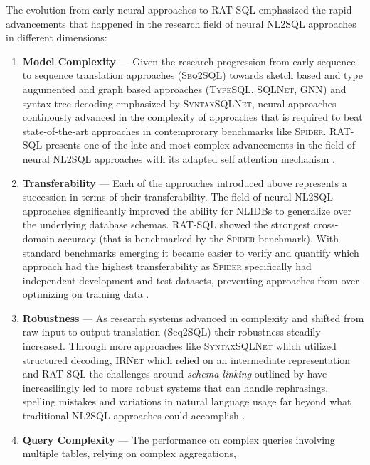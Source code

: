 \documentclass{article}
\begin{document}
The evolution from early neural approaches to RAT-SQL emphasized the rapid advancements that happened in the research field of 
neural NL2SQL approaches in different dimensions:

\begin{enumerate}
    \item \textbf{Model Complexity} — Given the research progression from early sequence to sequence translation approaches 
          (\textsc{Seq2SQL}) towards sketch based and type augumented and graph based approaches (\textsc{TypeSQL, SQLNet, GNN})
          and syntax tree decoding emphasized by \textsc{SyntaxSQLNet}, neural approaches continously advanced in the complexity of 
          approaches that is required to beat state-of-the-art approaches in contemprorary benchmarks like \textsc{Spider}. RAT-SQL 
          presents one of the late and most complex advancements in the field of neural NL2SQL approaches with its adapted self 
          attention mechanism \citep{Seq2SQL, TypeSQL, GNN, SyntaxSQLNet, RATSQL}.
    \item \textbf{Transferability} — Each of the approaches introduced above represents a succession in terms of their transferability.
          The field of neural NL2SQL approaches significantly improved the ability for NLIDBs to generalize over the underlying database
          schemas. RAT-SQL showed the strongest cross-domain accuracy (that is benchmarked by the \textsc{Spider} benchmark). With
          standard benchmarks emerging it became easier to verify and quantify which approach had the highest transferability as
          \textsc{Spider} specifically had independent development and test datasets, preventing approaches from over-optimizing on
          training data \citep{Spider, RATSQL}.
    \item \textbf{Robustness} — As research systems advanced in complexity and shifted from raw input to output translation (Seq2SQL)
          their robustness steadily increased. Through more approaches like \textsc{SyntaxSQLNet} which utilized structured decoding,
          \textsc{IRNet} which relied on an intermediate representation and \textsc{RAT-SQL} the challenges around \textit{schema linking}
          outlined by \cite{RATSQL} have increasilingly led to more robust systems that can handle rephrasings, spelling mistakes and
          variations in natural language usage far beyond what traditional NL2SQL approaches could accomplish \cite{SyntaxSQLNet, IRNet, RATSQL}.
    \item \textbf{Query Complexity} — The performance on complex queries involving multiple tables, relying on complex aggregations,

\end{enumerate}
\end{document}
